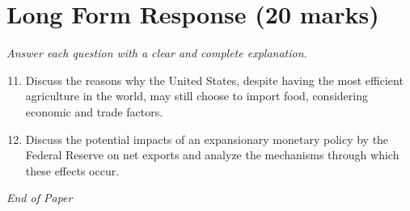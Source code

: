 \documentclass[12pt]{article}
\begin{document}
\section*{Long Form Response (20 marks)}
\textit{Answer each question with a clear and complete explanation.}
\begin{enumerate}[label=\arabic*.]
\setcounter{enumi}{10}
\item Discuss the reasons why the United States, despite having the most efficient agriculture
in the world, may still choose to import food, considering economic and trade factors.
\item Discuss the potential impacts of an expansionary monetary policy by the Federal Reserve on
net exports and analyze the mechanisms through which these effects occur.
\end{enumerate}

\vfill
\noindent\textit{End of Paper}
\end{document}
